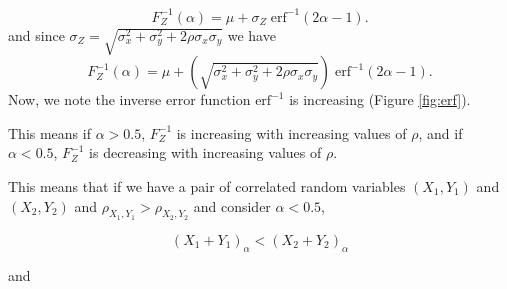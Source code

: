 \documentclass[12pt,twoside]{smiththesis}
\begin{document}
\[F_Z^{-1}(\alpha)=\mu +\sigma_Z \; \text{erf}^{-1}(2\alpha - 1).\]
and since \(\sigma_Z=\sqrt{\sigma_x^2 +\sigma_y^2 + 2 \rho \sigma_x \sigma_y }\) we have
\[F_Z^{-1}(\alpha)=\mu + \left(\sqrt{\sigma_x^2 +\sigma_y^2 + 2 \rho \sigma_x \sigma_y } \right) \; \text{erf}^{-1}(2\alpha - 1).\]
Now, we note the inverse error function \(\text{erf}^{-1}\) is increasing (Figure \ref{fig:erf}).

This means if \(\alpha > 0.5\), \(F_Z^{-1}\) is increasing with increasing values of \(\rho\), and if \(\alpha < 0.5\), \(F_Z^{-1}\) is decreasing with increasing values of \(\rho\).

This means that if we have a pair of correlated random variables \((X_1,Y_1)\) and \((X_2,Y_2)\) and \(\rho_{X_1,Y_1} > \rho_{X_2,Y_2}\) and consider \(\alpha < 0.5\),

\[(X_1+Y_1)_\alpha <(X_2+Y_2)_\alpha\]

and
\end{document}
